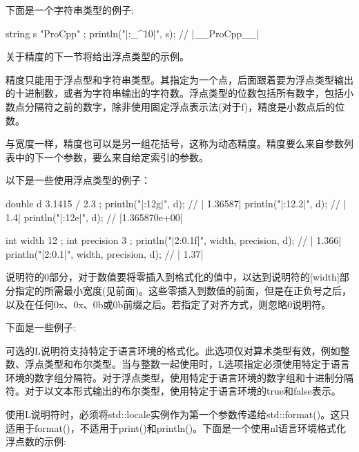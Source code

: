 下面是一个字符串类型的例子:

\begin{cpp}
string s { "ProCpp" };
println("|{:_^10}|", s); // |__ProCpp__|
\end{cpp}

关于精度的下一节将给出浮点类型的示例。


精度只能用于浮点型和字符串类型。其指定为一个点，后面跟着要为浮点类型输出的十进制数，或者为字符串输出的字符数。浮点类型的位数包括所有数字，包括小数点分隔符之前的数字，除非使用固定浮点表示法(对于f)，精度是小数点后的位数。

与宽度一样，精度也可以是另一组花括号，这称为动态精度。精度要么来自参数列表中的下一个参数，要么来自给定索引的参数。

以下是一些使用浮点类型的例子：

\begin{cpp}
double d { 3.1415 / 2.3 };
println("|{:12g}|", d);   // |     1.36587|
println("|{:12.2}|", d);  // |         1.4|
println("|{:12e}|", d);   // |1.365870e+00|

int width { 12 };
int precision { 3 };
println("|{2:{0}.{1}f}|", width, precision, d); // |     1.366|
println("|{2:{0}.{1}}|", width, precision, d);  // |      1.37|
\end{cpp}


说明符的0部分，对于数值要将零插入到格式化的值中，以达到说明符的[width]部分指定的所需最小宽度(见前面)。这些零插入到数值的前面，但是在正负号之后，以及在任何0x、0x、0b或0b前缀之后。若指定了对齐方式，则忽略0说明符。

下面是一些例子:



可选的L说明符支持特定于语言环境的格式化。此选项仅对算术类型有效，例如整数、浮点类型和布尔类型。当与整数一起使用时，L选项指定必须使用特定于语言环境的数字组分隔符。对于浮点类型，使用特定于语言环境的数字组和十进制分隔符。对于以文本形式输出的布尔类型，使用特定于语言环境的true和false表示。

使用L说明符时，必须将std::locale实例作为第一个参数传递给std::format()。这只适用于format()，不适用于print()和println()。下面是一个使用nl语言环境格式化浮点数的示例:

